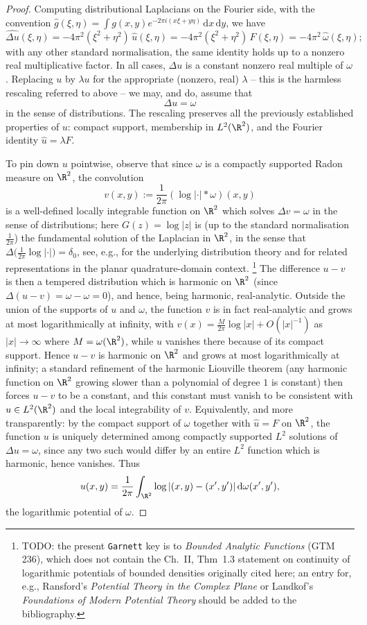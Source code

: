 \begin{proof}
Computing distributional Laplacians on the Fourier side, with the
convention $\widehat g(\xi,\eta)=\int g(x,y)e^{-2\pi i(x\xi+y\eta)}\,
\mathrm{d}x\,\mathrm{d}y$, we have
\[
\widehat{\Delta u}(\xi,\eta) = -4\pi^2(\xi^2+\eta^2)\,\widehat{u}(\xi,\eta)
= -4\pi^2(\xi^2+\eta^2)\,F(\xi,\eta) = -4\pi^2\,\widehat\omega(\xi,\eta);
\]
with any other standard normalisation, the same identity holds up to a
nonzero real multiplicative factor. In all cases, $\Delta u$ is a constant
nonzero real multiple of $\omega$. Replacing $u$ by $\lambda u$ for the
appropriate (nonzero, real) $\lambda$ -- this is the harmless rescaling
referred to above -- we may, and do, assume that
\[
\Delta u = \omega
\]
in the sense of distributions. The rescaling preserves all the previously
established properties of $u$: compact support, membership in $L^2(\R^2)$,
and the Fourier identity $\widehat u = \lambda F$.

To pin down $u$ pointwise, observe that since $\omega$ is a compactly
supported Radon measure on $\R^2$, the convolution
\[
v(x,y) := \frac{1}{2\pi}(\log|\cdot|*\omega)(x,y)
\]
is a well-defined locally integrable function on $\R^2$ which solves
$\Delta v = \omega$ in the sense of distributions; here $G(z)=\log|z|$ is
(up to the standard normalisation $\tfrac{1}{2\pi}$) the fundamental solution
of the Laplacian in $\R^2$, in the sense that
$\Delta\bigl(\tfrac{1}{2\pi}\log|\cdot|\bigr)=\delta_0$, see, e.g.,
\cite{Hormander} for the underlying distribution theory and
\cite{Aharonov-Schiffer-Zalcman} for related representations in the planar
quadrature-domain context.%
\footnote{TODO: the present \texttt{Garnett} key is to \emph{Bounded
Analytic Functions} (GTM 236), which does not contain the Ch.~II,
Thm~1.3 statement on continuity of logarithmic potentials of bounded
densities originally cited here; an entry for, e.g., Ransford's
\emph{Potential Theory in the Complex Plane} or Landkof's
\emph{Foundations of Modern Potential Theory} should be added to the
bibliography.} The difference $u-v$ is then a tempered
distribution which is harmonic on $\R^2$ (since
$\Delta(u-v)=\omega-\omega=0$), and hence, being harmonic, real-analytic.
Outside the union of the supports of $u$ and $\omega$, the function $v$ is
in fact real-analytic and grows at most logarithmically at infinity, with
$v(x)=\frac{M}{2\pi}\log|x|+O(|x|^{-1})$ as $|x|\to\infty$ where
$M=\omega(\R^2)$, while $u$ vanishes there because of its compact support.
Hence $u-v$ is harmonic on $\R^2$ and grows at most logarithmically at
infinity; a standard refinement of the harmonic Liouville theorem (any
harmonic function on $\R^2$ growing slower than a polynomial of degree $1$
is constant) then forces $u-v$ to be a constant, and this constant must
vanish to be consistent with $u\in L^2(\R^2)$ and the local integrability
of $v$. Equivalently, and more transparently: by the compact support of
$\omega$ together with $\widehat u = F$ on $\R^2$, the function $u$ is
uniquely determined among compactly supported $L^2$ solutions of
$\Delta u = \omega$, since any two such would differ by an entire $L^2$
function which is harmonic, hence vanishes. Thus
\[
u(x,y)=\frac{1}{2\pi}\int_{\R^2}\log|(x,y)-(x',y')|\,\mathrm{d}\omega(x',y'),
\]
the logarithmic potential of $\omega$.


\end{proof}
